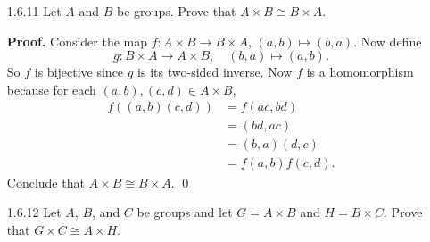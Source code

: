 \begin{enumerate}
      \begin{enumerate}
         \item Let $\sigma \in S_\triangle$. Notice that
               $\varphi(\sigma) = \theta\circ\sigma\circ\theta^{-1}$ maps
               $\Omega$ into $\Omega$, and is also a bijecton since it is a
               composition of bijective maps. Thus
               $\varphi(\sigma) \in S_\Omega$, so that $\varphi$ is well
               defined.
         \item Consider the map
               $$\alpha : S_\Omega \rightarrow S_\triangle \qquad
                 \text{by} \qquad \alpha(\sigma) = \theta \circ \sigma^{-1} 
                 \circ \theta^{-1} \text{ for all } \sigma \in S_\Omega.$$
               A trivial computation will show us that $\varphi\circ\alpha$ is
               the identity map on $S_\Omega$ and $\alpha\circ\varphi$ is the
               identity map on $S_\triangle$. Thus $\varphi$ is a bijection.
         \item Let $\sigma, \tau \in S_\triangle$. So
               \begin{align*}
                  \varphi(\sigma\circ\tau) &=
                     \theta\circ\sigma\circ\tau\circ\theta^{-1} \\
                     &= \theta\circ\sigma\circ\theta^{-1}\circ\theta\circ
                        \tau\circ\theta^{-1} \\
                     &= \varphi(\sigma) \circ \varphi(\tau);
               \end{align*}
               i.e., $\varphi$ is a homomoirphism.
      \end{enumerate} \qed
   \item[1.6.11]  Let $A$ and $B$ be groups. Prove that
                  $A \times B \cong B\times A$.

      \textbf{Proof.} Consider the map $f : A \times B \rightarrow B \times A$,
      $(a, b) \mapsto (b, a)$. Now define
      $$g : B \times A\rightarrow A\times B, \quad (b, a) \mapsto (a, b).$$
      So $f$ is bijective since $g$ is its two-sided inverse. Now $f$ is a
      homomorphism because for each $(a, b), (c, d) \in A \times B$,
      \begin{align*}
         f((a, b)(c, d)) &= f(ac, bd) \\
            &= (bd, ac) \\
            &= (b, a)(d, c) \\
            &= f(a, b)f(c, d).
      \end{align*}
      Conclude that $A \times B \cong B\times A$. \qed
   \item[1.6.12]  Let $A$, $B$, and $C$ be groups and let $G = A \times B$ and
                  $H = B \times C$. Prove that $G \times C \cong A \times H$.


\end{enumerate}
